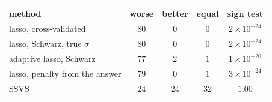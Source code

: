 \begin{center}
\footnotesize
\begin{tabular}{lcccc}
method & worse & better & equal & sign test \\
\hline
lasso, cross-validated & $80$ & $0$ & $0$ & $2 \times 10^{-24}$ \\
lasso, Schwarz, true $\sigma$ & $80$ & $0$ & $0$ & $2 \times 10^{-24}$ \\
adaptive lasso, Schwarz & $77$ & $2$ & $1$ & $1 \times 10^{-20}$ \\
lasso, penalty from the answer & $79$ & $0$ & $1$ & $3 \times 10^{-24}$ \\
SSVS & $24$ & $24$ & $32$ & $1.00$ \\
\end{tabular}
\end{center}

